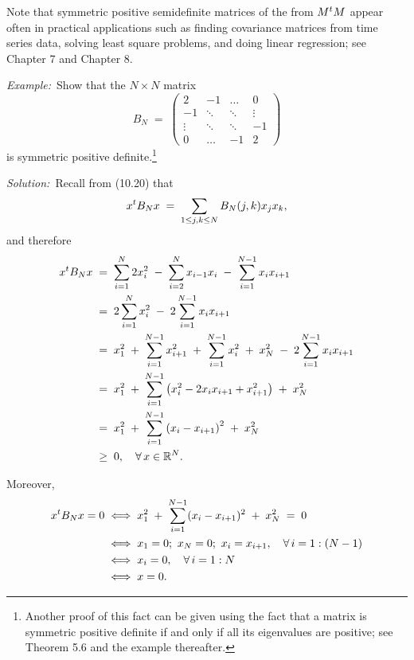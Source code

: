 Note that symmetric positive semidefinite matrices of the from $M^{t} M$ appear often
in practical applications such as finding covariance matrices from time series data,
solving least square problems, and doing linear regression; see Chapter 7 and
Chapter 8.

\par\medskip\noindent\textit{Example:}\ Show that the $N \times N$ matrix
\[
B_N \;=\; \begin{pmatrix}
2 & -1 & \dots & 0\\
-1 & \ddots & \ddots & \vdots\\
\vdots & \ddots & \ddots & -1\\
0 & \dots & -1 & 2
\end{pmatrix}
\]
is symmetric positive definite.\footnote{Another proof of this fact can be given using
the fact that a matrix is symmetric positive definite if and only if all its
eigenvalues are positive; see Theorem 5.6 and the example thereafter.}

\par\medskip\noindent\textit{Solution:}\ Recall from (10.20) that
\[
x^{t} B_Nx \;=\; \sum_{1 \leq j,k \leq N} B_N(j,k)x_jx_k,
\]
and therefore
\begin{align*}
x^{t} B_Nx &\;=\; \sum_{i=1}^{N} 2x_i^2 \;-\; \sum_{i=2}^{N} x_{i-1}x_i \;-\;
\sum_{i=1}^{N-1} x_ix_{i+1}\\
&\;=\; 2\sum_{i=1}^{N} x_i^2 \;-\; 2\sum_{i=1}^{N-1} x_ix_{i+1}\\
&\;=\; x_1^2 \;+\; \sum_{i=1}^{N-1} x_{i+1}^2 \;+\; \sum_{i=1}^{N-1} x_i^2 \;+\; x_N^2
\;-\; 2\sum_{i=1}^{N-1} x_ix_{i+1}\\
&\;=\; x_1^2 \;+\; \sum_{i=1}^{N-1} \left(x_i^2 - 2x_ix_{i+1} + x_{i+1}^2\right) \;+\;
x_N^2\\
&\;=\; x_1^2 \;+\; \sum_{i=1}^{N-1} \left(x_i - x_{i+1}\right)^2 \;+\; x_N^2\\
&\;\geq\; 0, \quad \forall\, x \in \mathbb{R}^N.
\end{align*}

Moreover,
\begin{align*}
x^{t} B_Nx = 0 &\iff x_1^2 \;+\; \sum_{i=1}^{N-1} (x_i - x_{i+1})^2 \;+\; x_N^2 \;=\; 0\\
&\iff x_1 = 0;\ x_N = 0;\ x_i = x_{i+1}, \quad \forall\, i = 1:(N-1)\\
&\iff x_i = 0, \quad \forall\, i = 1:N\\
&\iff x = 0.
\end{align*}

